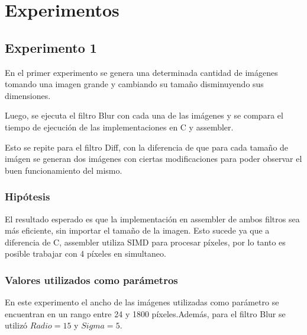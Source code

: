 \section{Experimentos}
	
	\subsection{Experimento 1}
		En el primer experimento se genera una determinada cantidad de imágenes tomando una imagen grande y cambiando su tamaño disminuyendo sus dimensiones.
	
		Luego, se ejecuta el filtro Blur con cada una de las imágenes y se compara el tiempo de ejecución de las implementaciones en C y assembler.
	
		Esto se repite para el filtro Diff, con la diferencia de que para cada tamaño de imágen se generan dos imágenes con ciertas modificaciones para poder observar el buen funcionamiento del mismo.


	\subsubsection{Hipótesis} 
		El resultado esperado es que la implementación en assembler de ambos filtros sea más eficiente, sin importar el tamaño de la imagen. Esto sucede ya que a diferencia de C, assembler utiliza SIMD para procesar píxeles, por lo tanto es posible trabajar con 4 píxeles en simultaneo.

	\subsubsection{Valores utilizados como parámetros} 		
		En este experimento el ancho de las imágenes utilizadas como parámetro se encuentran en un rango entre 24 y 1800 píxeles.Además, para el filtro Blur se utilizó $Radio = 15$ y $Sigma = 5$.

